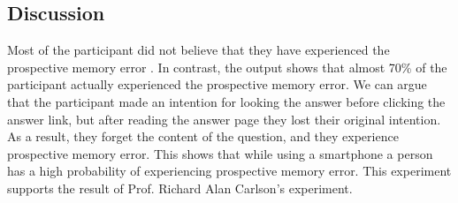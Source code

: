 \subsection{Discussion}

Most of the participant did not believe that they have experienced the prospective memory error
. In contrast, the output shows that  almost 70\% of the participant actually experienced the prospective memory error.
We can argue that the participant made an intention for looking the answer before clicking the answer link, but after reading the answer page
they lost their original intention.
As a result, they forget the content of the question, and they experience prospective memory error.
This shows that while using a smartphone a person has a high probability of experiencing prospective memory error.
This experiment supports the result of Prof. Richard Alan Carlson's experiment.



